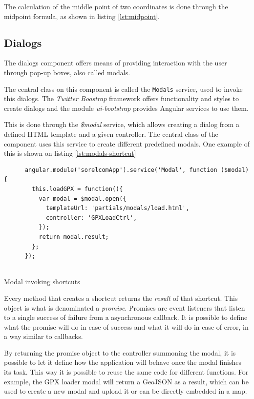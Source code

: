 The calculation of the middle point of two coordinates is done through the midpoint formula, as shown in listing \ref{lst:midpoint}.

\subsection{Dialogs}

The dialogs component offers means of providing interaction with the user through pop-up boxes, also called modals.

The central class on this component is called the \texttt{Modals} service, used to invoke this dialogs. The \textit{Twitter Boostrap} framework offers functionality and styles to create dialogs and the module \textit{ui-bootstrap} provides Angular services to use them.

This is done through the \textit{\$modal} service, which allows creating a dialog from a defined HTML template and a given controller. The central class of the component uses this service to create different predefined modals. One example of this is shown on listing \ref{lst:modals-shortcut}

\begin{listing}[ht]\centering
  \begin{minipage}{.7\textwidth}
    \begin{verbatim}
      angular.module('sorelcomApp').service('Modal', function ($modal){
        this.loadGPX = function(){
          var modal = $modal.open({
            templateUrl: 'partials/modals/load.html',
            controller: 'GPXLoadCtrl',
          });
          return modal.result;
        };
      });
      
    \end{verbatim}
  \end{minipage}
  \caption{Modal invoking shortcuts}\label{lst:modals-shortcut}
\end{listing}

Every method that creates a shortcut returns the \textit{result} of that shortcut. This object is what is denominated a \textit{promise}. Promises are event listeners that listen to a single success of failure from a asynchronous callback. It is possible to define what the promise will do in case of success and what it will do in case of error, in a way similar to callbacks.

By returning the promise object to the controller summoning the modal, it is possible to let it define how the application will behave once the modal finishes its task. This way it is possible to reuse the same code for different functions. For example, the GPX loader modal will return a GeoJSON as a result, which can be used to create a new modal and upload it or can be directly embedded in a map.

